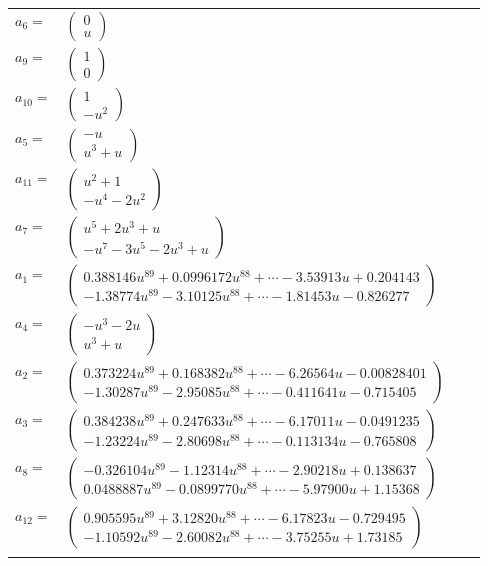 \documentclass[1p]{elsarticle_modified}
\theoremstyle{definition}
\begin{document}
\begin{tabular}{m{7pt} m{180pt} m{7pt} m{180pt} }
\flushright $a_{6}=$&$\begin{pmatrix}0\\u\end{pmatrix}$ \\
\flushright $a_{9}=$&$\begin{pmatrix}1\\0\end{pmatrix}$ \\
\flushright $a_{10}=$&$\begin{pmatrix}1\\- u^2\end{pmatrix}$ \\
\flushright $a_{5}=$&$\begin{pmatrix}- u\\u^3+u\end{pmatrix}$ \\
\flushright $a_{11}=$&$\begin{pmatrix}u^2+1\\- u^4-2 u^2\end{pmatrix}$ \\
\flushright $a_{7}=$&$\begin{pmatrix}u^5+2 u^3+u\\- u^7-3 u^5-2 u^3+u\end{pmatrix}$ \\
\flushright $a_{1}=$&$\begin{pmatrix}0.388146 u^{89}+0.0996172 u^{88}+\cdots-3.53913 u+0.204143\\-1.38774 u^{89}-3.10125 u^{88}+\cdots-1.81453 u-0.826277\end{pmatrix}$ \\
\flushright $a_{4}=$&$\begin{pmatrix}- u^3-2 u\\u^3+u\end{pmatrix}$ \\
\flushright $a_{2}=$&$\begin{pmatrix}0.373224 u^{89}+0.168382 u^{88}+\cdots-6.26564 u-0.00828401\\-1.30287 u^{89}-2.95085 u^{88}+\cdots-0.411641 u-0.715405\end{pmatrix}$ \\
\flushright $a_{3}=$&$\begin{pmatrix}0.384238 u^{89}+0.247633 u^{88}+\cdots-6.17011 u-0.0491235\\-1.23224 u^{89}-2.80698 u^{88}+\cdots-0.113134 u-0.765808\end{pmatrix}$ \\
\flushright $a_{8}=$&$\begin{pmatrix}-0.326104 u^{89}-1.12314 u^{88}+\cdots-2.90218 u+0.138637\\0.0488887 u^{89}-0.0899770 u^{88}+\cdots-5.97900 u+1.15368\end{pmatrix}$ \\
\flushright $a_{12}=$&$\begin{pmatrix}0.905595 u^{89}+3.12820 u^{88}+\cdots-6.17823 u-0.729495\\-1.10592 u^{89}-2.60082 u^{88}+\cdots-3.75255 u+1.73185\end{pmatrix}$\\&\end{tabular}
\end{document}
